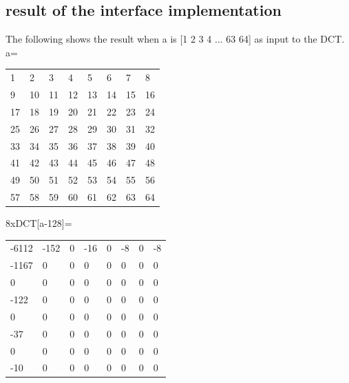 \documentclass[a4paper]{article}
\begin{document}
\subsection{result of the interface implementation}
The following shows the result when a is [1 2 3 4 ... 63 64] as input to the DCT.
a=  \newline  \newline
\begin{tabular}{l l l l l l l l}
1 & 2 & 3 & 4 & 5 & 6 & 7 & 8 \\
9  &  10  &  11   & 12 &   13  &  14 &   15 &   16  \\
17   & 18  &  19  &  20  &  21  &  22  &  23  &  24  \\
25  &  26  &  27  &  28  &  29  &  30  &  31  &  32  \\
33  &  34  &  35  &  36  &  37  &  38  &  39  &  40  \\
41  &  42  &  43  &  44  &  45  &  46  &  47  &  48  \\
49  &  50  &  51  &  52  &  53  &  54 &   55  &  56  \\
57   & 58  &  59  &  60  &  61 &   62  &  63  &  64  \\
\end{tabular}
 \newline  \newline  \newline  
8xDCT[a-128]=  \newline  \newline
\begin{tabular}{l l l l l l l l}
-6112  & -152   &   0   & -16   &   0  &   -8   &   0  &   -8 \\
-1167   &   0    &  0   &   0   &   0   &   0   &   0  &    0 \\
    0   &   0   &   0   &   0    &  0   &   0    &  0   &   0 \\
 -122  &    0   &   0   &   0   &   0   &   0    &  0   &   0 \\
    0    &  0   &   0   &   0    &  0   &   0    &  0   &   0 \\
  -37   &   0   &   0   &   0   &   0   &   0   &   0   &   0 \\
    0   &   0   &   0   &   0  &    0   &   0   &   0   &   0 \\
  -10   &   0   &   0  &    0   &   0   &   0   &   0   &   0 \\

\end{tabular}
 \newline  \newline  \newline
\end{document}
